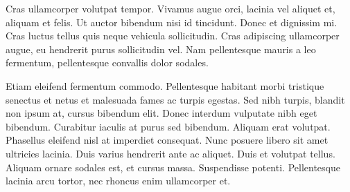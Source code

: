 Cras ullamcorper volutpat tempor. Vivamus augue orci, lacinia vel aliquet et, aliquam et felis. Ut auctor bibendum nisi id tincidunt. Donec et dignissim mi. Cras luctus tellus quis neque vehicula sollicitudin. Cras adipiscing ullamcorper augue, eu hendrerit purus sollicitudin vel. Nam pellentesque mauris a leo fermentum, pellentesque convallis dolor sodales.

Etiam eleifend fermentum commodo. Pellentesque habitant morbi tristique senectus et netus et malesuada fames ac turpis egestas. Sed nibh turpis, blandit non ipsum at, cursus bibendum elit. Donec interdum vulputate nibh eget bibendum. Curabitur iaculis at purus sed bibendum. Aliquam erat volutpat. Phasellus eleifend nisl at imperdiet consequat. Nunc posuere libero sit amet ultricies lacinia. Duis varius hendrerit ante ac aliquet. Duis et volutpat tellus. Aliquam ornare sodales est, et cursus massa. Suspendisse potenti. Pellentesque lacinia arcu tortor, nec rhoncus enim ullamcorper et.